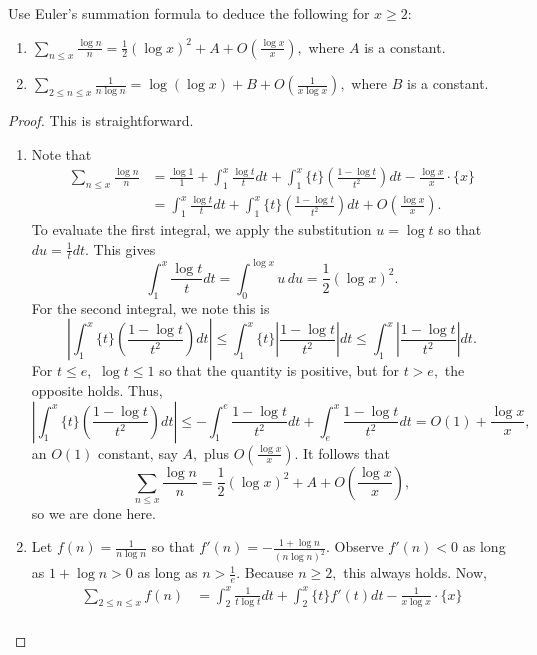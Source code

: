 \begin{exercise}
Use Euler's summation formula to deduce the following for $x\ge2$:
\begin{enumerate}[label=(\alph*)]
    \item$\displaystyle\sum_{n\le x}\frac{\log n}n=\frac12(\log x)^2+A+O\left(\frac{\log x}x\right),$ where $A$ is a constant.
    \item$\displaystyle\sum_{2\le n\le x}\frac1{n\log n}=\log(\log x)+B+O\left(\frac1{x\log x}\right),$ where $B$ is a constant.
\end{enumerate}
\end{exercise}

\begin{proof}
This is straightforward.
\begin{enumerate}[label=(\alph*)]
    \item Note that
    \begin{align*}
        \sum_{n\le x}\frac{\log n}n &= \frac{\log1}1+\int_1^x\frac{\log t}tdt+\int_1^x\{t\}\left(\frac{1-\log t}{t^2}\right)dt-\frac{\log x}x\cdot\{x\} \\
        &= \int_1^x\frac{\log t}tdt+\int_1^x\{t\}\left(\frac{1-\log t}{t^2}\right)dt+O\left(\frac{\log x}x\right).
    \end{align*}
    To evaluate the first integral, we apply the substitution $u=\log t$ so that $du=\frac1tdt.$ This gives
    \[\int_1^x\frac{\log t}tdt=\int_0^{\log x}u\,du=\frac12\left(\log x\right)^2.\]
    For the second integral, we note this is
    \[\left|\int_1^x\{t\}\left(\frac{1-\log t}{t^2}\right)dt\right|\le\int_1^x\{t\}\left|\frac{1-\log t}{t^2}\right|dt\le\int_1^x\left|\frac{1-\log t}{t^2}\right|dt.\]
    For $t\le e,$ $\log t\le1$ so that the quantity is positive, but for $t>e,$ the opposite holds. Thus,
    \[\left|\int_1^x\{t\}\left(\frac{1-\log t}{t^2}\right)dt\right|\le-\int_1^e\frac{1-\log t}{t^2}dt+\int_e^x\frac{1-\log t}{t^2}dt=O(1)+\frac{\log x}x,\]
    an $O(1)$ constant, say $A,$ plus $O\left(\frac{\log x}x\right).$ It follows that
    \[\sum_{n\le x}\frac{\log n}n = \frac12\left(\log x\right)^2+A+O\left(\frac{\log x}x\right),\]
    so we are done here.
    \item Let $f(n)=\frac1{n\log n}$ so that $f'(n)=-\frac{1+\log n}{(n\log n)^2}.$ Observe $f'(n)<0$ as long as $1+\log n>0$ as long as $n>\frac1e.$ Because $n\ge2,$ this always holds. Now,
    \begin{align*}
        \sum_{2\le n\le x}f(n) &= \int_2^x\frac1{t\log t}dt+\int_2^x\{t\}f'(t)dt-\frac1{x\log x}\cdot\{x\} \\

\end{align*}
\end{enumerate}
\end{proof}
